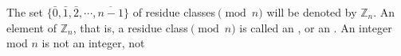 \documentclass[11pt]{amsbook}
\begin{document}
The set $\{ \bar{0},\bar{1},\bar{2},\cdots,\overline{n-1} \}$ of residue classes$\pmod{n}$
will be denoted by $\mathbb{Z}_n$. An element of $\mathbb{Z}_n$, that is, a residue class$\pmod{n}$
is called an , or an .
An integer mod $n$ is not an integer, not

\end{document}
